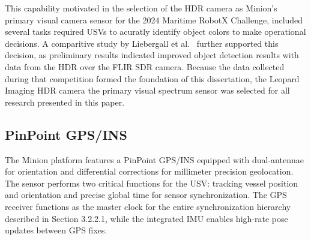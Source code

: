 \documentclass{erauthesis}
\begin{document}
This capability motivated in the selection of the \ac{HDR} camera as Minion's primary visual camera sensor for the 2024 Maritime RobotX Challenge, included several tasks required \acp{USV} to acuratly identify object colors to make operational decisions.
A comparitive study by Liebergall et al.~\cite{liebergall} further supported this decision, as preliminary results indicated improved object detection results with data from the \ac{HDR} over the FLIR \ac{SDR} camera. 
Because the data collected during that competition formed the foundation of this dissertation, the Leopard Imaging \ac{HDR} camera the primary visual spectrum sensor was selected for all research presented in this paper.






\subsection{PinPoint GPS/INS} \label{sensors_GPS}

The Minion platform features a PinPoint \ac{GPS}/\ac{INS} equipped with dual-antennae for orientation and differential corrections for millimeter precision geolocation.
The sensor performs two critical functions for the \ac{USV}: tracking vessel position and orientation and precise global time for sensor synchronization.
The \ac{GPS} receiver functions as the master clock for the entire synchronization hierarchy described in Section 3.2.2.1, while the integrated \ac{IMU} enables high-rate pose updates between \ac{GPS} fixes.

\end{document}
